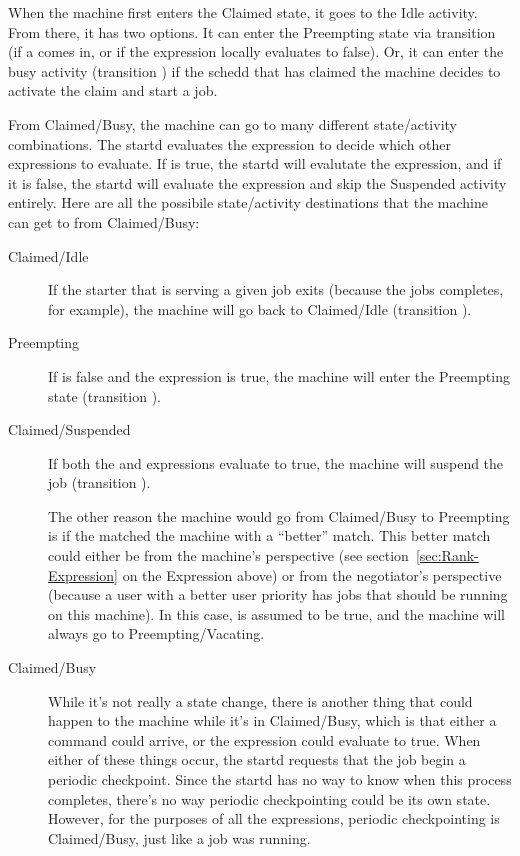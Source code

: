 When the machine first enters the Claimed state, it goes to the Idle
activity.  From there, it has two options.  
It can enter the Preempting state via transition  (if a 
 comes in, or if the  expression locally
evaluates to false).  
Or, it can enter the busy activity (transition ) if the
schedd that has claimed the machine decides to activate the claim and
start a job.

From Claimed/Busy, the machine can go to many different state/activity
combinations.
The startd evaluates the  expression to decide
which other expressions to evaluate.  
If  is true, the startd will evalutate the
 expression, and if it is false, the startd will
evaluate the  expression and skip the Suspended activity
entirely.
Here are all the possibile state/activity destinations that the
machine can get to from Claimed/Busy:

\begin{description}
  
\item[Claimed/Idle] If the starter that is serving a given job exits
  (because the jobs completes, for example), the machine will go back
  to Claimed/Idle (transition ).
  
\item[Preempting] If  is false and the
   expression is true, the machine will enter the
  Preempting state (transition ).
  
\item[Claimed/Suspended] If both the  and
   expressions evaluate to true, the machine will
  suspend the job (transition ).
  
  The other reason the machine would go from Claimed/Busy to
  Preempting is if the  matched the machine
  with a ``better'' match.  This better match could either be from the
  machine's perspective (see section~\ref{sec:Rank-Expression} on the
   Expression above) or from the negotiator's perspective
  (because a user with a better user priority has jobs that should be
  running on this machine).
  In this case,  is assumed to be true, and the
  machine will always go to Preempting/Vacating.
  
\item[Claimed/Busy] While it's not really a state change, there is
  another thing that could happen to the machine while it's in
  Claimed/Busy, which is that either a  command
  could arrive, or the  expression could
  evaluate to true.  When either of these things occur, the startd
  requests that the job begin a periodic checkpoint.  Since the startd
  has no way to know when this process completes, there's no way
  periodic checkpointing could be its own state.  However, for the
  purposes of all the expressions, periodic checkpointing is
  Claimed/Busy, just like a job was running.

\end{description}

